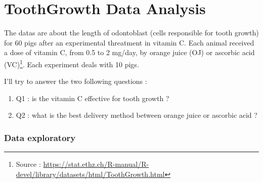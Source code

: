 \documentclass[a4paper, 10pt]{article}\usepackage[]{graphicx}\usepackage[]{color}
\begin{document}

\newpage

\part{ToothGrowth Data Analysis}
The datas are about the length of odontoblast (cells responsible for tooth growth) for 60 pigs after an experimental threatment in vitamin C. Each animal received a dose of vitamin C, from 0.5 to 2 mg/day, by orange juice (OJ) or ascorbic acid (VC)\footnote{Source : \url{https://stat.ethz.ch/R-manual/R-devel/library/datasets/html/ToothGrowth.html}}. Each experiment deals with 10 pigs.

\noindent
I'll try to answer the two following questions :
\begin{enumerate}
    \item Q1 : is the vitamin C effective for tooth growth ?
    \item Q2 : what is the best delivery method between orange juice or ascorbic acid ?
\end{enumerate}

\section{Data exploratory}
\end{document}
